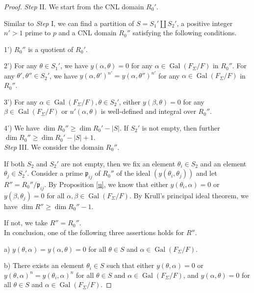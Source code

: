 \documentclass[12pt]{amsart}
\theoremstyle{plain}
\theoremstyle{definition}
\theoremstyle{remark}
\begin{document}
\begin{proof}
	\textit{Step} II. We start from the CNL domain $R_0'$.
	
	Similar to \textit{Step} I, we can find a partition of $S = S_1' \amalg S_2'$, a positive integer $n'>1$ prime to $p$ and a CNL domain $R_0''$ satisfying the following conditions.
	
	1') $R_0''$ is a quotient of $R_0'$.
	
	2') For any $\theta \in S_1'$, we have $y(\alpha, \theta)=0$ for any $\alpha \in \operatorname{Gal}(F_\Sigma/F)$ in $R_0''$. For any $\theta', \theta'' \in S_2'$, we have $y(\alpha, \theta')^{n'}=y(\alpha, \theta'')^{n'}$ for any $\alpha \in \operatorname{Gal}(F_\Sigma/F)$ in $R_0''$.
	
	3') For any $\alpha \in \operatorname{Gal}(F_\Sigma/F), \theta \in S_2'$, either $ y(\beta, \theta)=0$ for any $\beta \in \operatorname{Gal}(F_\Sigma/F)$ or $u'(\alpha, \theta)$ is well-defined and integral over $R_0''$.
	
	4') We have $\operatorname{dim} R_0'' \ge \operatorname{dim} R_0' - |S|$. If $S_2'$ is not empty, then further $\operatorname{dim} R_0'' \ge \operatorname{dim} R_0' - |S|+1$.\\
	 
	 \textit{Step} III. We consider the domain $R_0''$.
	 
	 If both $S_2$ and $S_2'$ are not empty, then we fix an element $\theta_{i} \in S_2$ and an element $\theta_{j} \in S_2'$. Consider a prime $\mathfrak{p}_{ij}$ of $R_0''$ of the ideal $(y(\theta_{i}, \theta_{j}))$ and let $R''=R_0''/\mathfrak{p}_{ij}$. By Proposition \ref{u}, we know that either $y(\theta_{i}, \alpha)=0$ or $y(\beta, \theta_{j})=0$ for all $\alpha, \beta \in \operatorname{Gal}(F_\Sigma/F)$. By Krull's principal ideal theorem, we have $\operatorname{dim} R'' \ge \operatorname{dim} R_0'' -1$.
	 
	 If not, we take $R''=R_0''$.\\
	 
	 In conclusion, one of the following three assertions holds for $R''$.
	 
	 a) $ y(\theta, \alpha) =y(\alpha, \theta)=0$ for all $\theta \in S$ and $\alpha \in \operatorname{Gal}(F_\Sigma/F)$.
	 
	 b) There exists an element $\theta_{i} \in S$ such that either $y(\theta, \alpha)=0$ or $y(\theta, \alpha)^{n}=y(\theta_i, \alpha)^{n}$ for all $\theta \in S$ and $\alpha \in \operatorname{Gal}(F_\Sigma/F)$, and $y(\alpha, \theta) =0 $ for all $\theta \in S$ and $\alpha \in \operatorname{Gal}(F_\Sigma/F)$.
	 

\end{proof}
\end{document}
